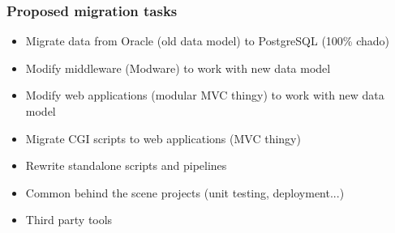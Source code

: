 \documentclass[hyperref={pdfpagelabels=false}, compress]{beamer}
\begin{document}
\begin{frame}
	\frametitle{Proposed migration tasks}
	
    	\begin{itemize}
		\item Migrate data from Oracle (old data model) to PostgreSQL (100\% chado)
    		\item Modify middleware (Modware) to work with new data model
    		\item Modify web applications (modular MVC thingy) to work with new data model
    		\item Migrate CGI scripts to web applications (MVC thingy)
    		\item Rewrite standalone scripts and pipelines
    		\item Common behind the scene projects (unit testing, deployment...)
    		\item Third party tools

	\end{itemize}
		
\end{frame}

\end{document}
